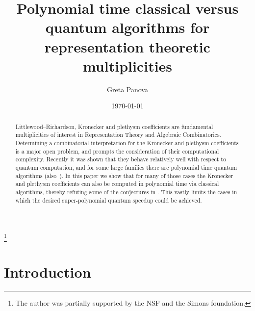 \documentclass[11pt]{amsart}
\theoremstyle{plain}
\theoremstyle{definition}
\numberwithin{equation}{section}
\begin{document}

\title[Polynomial time algorithms for multiplicities]{Polynomial time classical versus quantum algorithms for representation theoretic multiplicities}

\author{Greta Panova}
\address{Department of Mathematics, University of Southern California, 
Los Angeles, CA 90089}
\thanks{The author was partially supported  by the NSF and the Simons foundation.}


\date{\today}

\begin{abstract}
Littlewood--Richardson, Kronecker and plethysm coefficients are fundamental multiplicities of interest in Representation Theory and Algebraic Combinatorics. Determining a combinatorial interpretation for the Kronecker and plethysm coefficients is a major open problem, and prompts the consideration of their computational complexity. Recently it was shown that they behave relatively well with respect to quantum computation, and for some large families there are polynomial time quantum algorithms \cite{LH24} (also~\cite{bravyi2024quantum}). In this paper we show that for many of those cases the Kronecker and plethysm coefficients can also be computed in polynomial time via classical algorithms, thereby refuting some of the conjectures in \cite{LH24}. This vastly limits the  cases in which the desired super-polynomial quantum speedup could be achieved. 
\end{abstract}




\maketitle

\section{Introduction}
\end{document}
